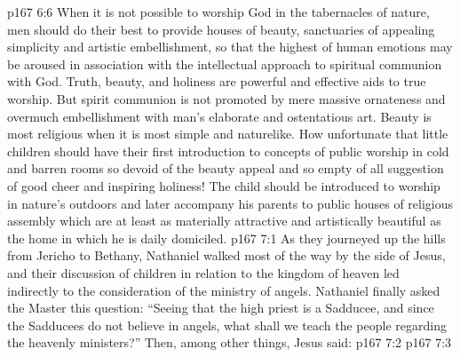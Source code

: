 \vs p167 6:6 When it is not possible to worship God in the tabernacles of nature, men should do their best to provide houses of beauty, sanctuaries of appealing simplicity and artistic embellishment, so that the highest of human emotions may be aroused in association with the intellectual approach to spiritual communion with God. Truth, beauty, and holiness are powerful and effective aids to true worship. But spirit communion is not promoted by mere massive ornateness and overmuch embellishment with man’s elaborate and ostentatious art. Beauty is most religious when it is most simple and naturelike. How unfortunate that little children should have their first introduction to concepts of public worship in cold and barren rooms so devoid of the beauty appeal and so empty of all suggestion of good cheer and inspiring holiness! The child should be introduced to worship in nature’s outdoors and later accompany his parents to public houses of religious assembly which are at least as materially attractive and artistically beautiful as the home in which he is daily domiciled.
\vs p167 7:1 As they journeyed up the hills from Jericho to Bethany, Nathaniel walked most of the way by the side of Jesus, and their discussion of children in relation to the kingdom of heaven led indirectly to the consideration of the ministry of angels. Nathaniel finally asked the Master this question: “Seeing that the high priest is a Sadducee, and since the Sadducees do not believe in angels, what shall we teach the people regarding the heavenly ministers?” Then, among other things, Jesus said:
\vs p167 7:2 \pc {}
\vs p167 7:3 
